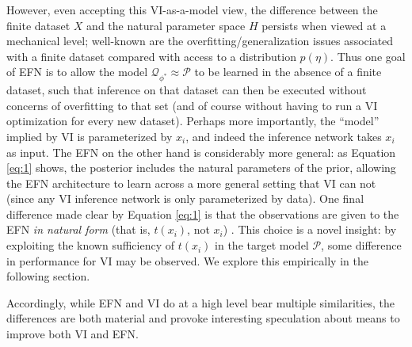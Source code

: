 \documentclass{article}
\begin{document}
However, even accepting this VI-as-a-model view, the difference between the finite dataset $X$ and the natural parameter space $H$ persists when viewed at a mechanical level; well-known are the overfitting/generalization issues associated with a finite dataset compared with access to a distribution $p(\eta)$.    Thus one goal of EFN is to allow the model $\mathcal{Q}_{\phi^*} \approx \mathcal{P}$ to be learned in the absence of a finite dataset, such that inference on that dataset can then be executed without concerns of overfitting to that set (and of course without having to run a VI optimization for every new dataset).   Perhaps more importantly, the ``model'' implied by VI is parameterized by $x_i$, and indeed the inference network takes $x_i$ as input.  The EFN on the other hand is considerably more general:  as Equation \ref{eq:1} shows, the posterior includes the natural parameters of the prior, allowing the EFN architecture to learn across a more general setting that VI can not (since any VI inference network is only parameterized by data).  One final difference made clear by Equation \ref{eq:1} is that the observations are given to the EFN \emph{in natural form} (that is, $t(x_i)$, not $x_i$) \cite{robert2007bayesian}.  This choice is a novel insight: by exploiting the known sufficiency of $t(x_i)$ in the target model $\mathcal{P}$, some difference in performance for VI may be observed.  We explore this empirically in the following section.

Accordingly, while EFN and VI do at a high level bear multiple similarities, the differences are both material and provoke interesting speculation about means to improve both VI and EFN.



 
 

 
\end{document}
